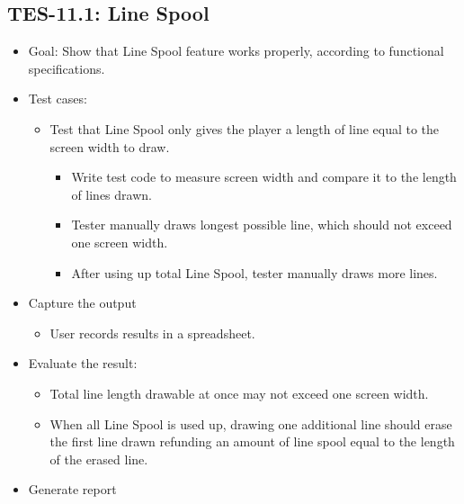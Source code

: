\subsection{TES-11.1: Line Spool }
\begin{itemize}
\item Goal: Show that Line Spool feature works properly, according to functional specifications.
\item Test cases: 

\begin{itemize}
\item Test that Line Spool only gives the player a length of line equal to the screen width to draw.
\begin{itemize}
\item Write test code to measure screen width and compare it to the length of lines drawn.
\item Tester manually draws longest possible line, which should not exceed one screen width.
\item After using up total Line Spool, tester manually draws more lines. 
\end{itemize}
\end{itemize}
\item Capture the output 
\begin{itemize}
\item User records results in a spreadsheet.
\end{itemize}
\item Evaluate the result: 

\begin{itemize}
\item Total line length drawable at once may not exceed one screen width.
\item When all Line Spool is used up, drawing one additional line should erase the first line drawn
refunding an amount of line spool equal to the length of the erased line. 
\end{itemize}
\item Generate report 
\end{itemize}

